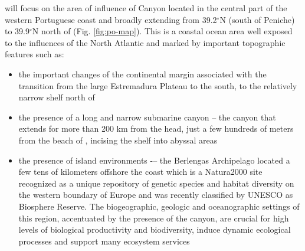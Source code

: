 \proj will focus on the area of influence of \naz Canyon located in
the central part of the western Portuguese coast and broadly extending
from 39.2$^{\circ}$N (south of Peniche) to 39.9$^{\circ}$N north of
\naz (Fig. \ref{fig:po-map}). This is a coastal ocean area well
exposed to the influences of the North Atlantic and marked by
important topographic features such as:

\begin{itemize}[noitemsep,topsep=0pt,parsep=0pt,partopsep=0pt]

\item the important changes of the continental margin associated with
  the transition from the large Estremadura Plateau to the south, to
  the relatively narrow shelf north of \naz

\item the presence of a long and narrow submarine canyon – the \naz
  canyon that extends for more than 200 km from the head, just a few
  hundreds of meters from the beach of \naze, incising the shelf into
  abyssal areas

\item the presence of island environments -– the Berlengas Archipelago
  located a few tens of kilometers offshore the coast which is a
  Natura2000 site recognized as a unique repository of genetic species
  and habitat diversity on the western boundary of Europe and was
  recently classified by UNESCO as Biosphere Reserve. The
  biogeographic, geologic and oceanographic settings of this region,
  accentuated by the presence of the \naz canyon, are crucial for
  high levels of biological productivity and biodiversity, induce
  dynamic ecological processes and support many ecosystem services

\end{itemize}


